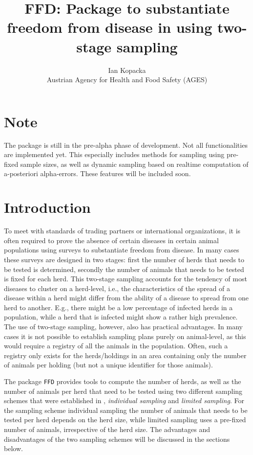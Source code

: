 \documentclass[nojss]{jss}
\title{FFD: Package to substantiate freedom from disease in 
\proglang{R} using two-stage sampling}
\author{Ian Kopacka\\Austrian Agency for Health and Food Safety (AGES)}
\begin{document}
%
%

\section*{Note}

The package is still in the pre-alpha phase of development. Not all 
functionalities are implemented yet. This especially includes 
methods for sampling using pre-fixed sample sizes, as well as 
dynamic sampling based on realtime computation of a-posteriori 
alpha-errors. These features will be included soon. 


\section{Introduction}
\label{sec:introduction}

To meet with standards of trading partners or international 
organizations, it is often required to prove the absence of certain 
diseases in certain animal populations using surveys to substantiate 
freedom from disease. In many cases these surveys are designed in 
two stages: first the number of herds that needs to be tested is 
determined, secondly the number of animals that needs to be tested 
is fixed for each herd. This two-stage sampling accounts for the 
tendency of most diseases to cluster on a herd-level, i.e., the 
characteristics of the spread of a disease within a herd might 
differ from the ability of a disease to spread from one herd to 
another. E.g., there might be a low percentage of infected herds in 
a population, while a herd that is infected might show a rather high 
prevalence. The use of two-stage sampling, however, also has 
practical advantages. In many cases it is not possible to establish 
sampling plans purely on animal-level, as this would require a 
registry of all the animals in the population. Often, such a 
registry only exists for the herds/holdings in an area containing 
only the number of animals per holding (but not a unique identifier 
for those animals). 

The package \texttt{FFD} provides tools to compute the number of 
herds, as well as the number of animals per herd that need to be 
tested using two different sampling schemes that were established in 
\cite{Ziller02}, \emph{individual sampling} and \emph{limited 
sampling}. For the sampling scheme individual sampling the number of 
animals that needs to be tested per herd depends on the herd size, 
while limited sampling uses a pre-fixed number of animals, 
irrespective of the herd size. The advantages and disadvantages of 
the two sampling schemes will be discussed in the sections below.  
\end{document}
